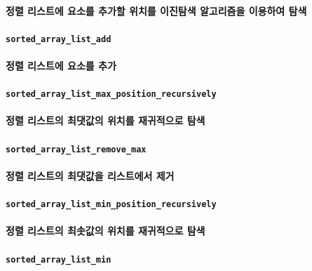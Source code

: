 \documentclass[UTF8, a4paper]{report}
\begin{document}
            \paragraph{%
                \normalfont 정렬 리스트에 요소를 추가할 위치를 이진탐색 알고리즘을 이용하여 탐색
            }

            \paragraph{\texttt{sorted\_array\_list\_add}}
            \paragraph{%
                \normalfont 정렬 리스트에 요소를 추가
            }

            \paragraph{\texttt{sorted\_array\_list\_max\_position\_recursively}}
            \paragraph{%
                \normalfont 정렬 리스트의 최댓값의 위치를 재귀적으로 탐색
            }

            \paragraph{\texttt{sorted\_array\_list\_remove\_max}}
            \paragraph{%
                \normalfont 정렬 리스트의 최댓값을 리스트에서 제거
            }

            \paragraph{\texttt{sorted\_array\_list\_min\_position\_recursively}}
            \paragraph{%
                \normalfont 정렬 리스트의 최솟값의 위치를 재귀적으로 탐색
            }

            \paragraph{\texttt{sorted\_array\_list\_min}}
\end{document}
